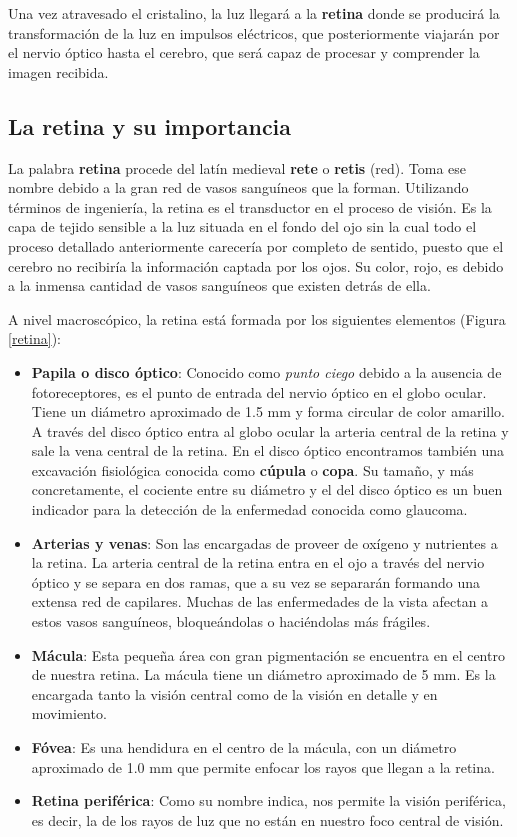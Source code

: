 \documentclass[
  12pt,
  spanish,
  a4paperpaper,
]{report}
\providecommand{\tightlist}{%
  \setlength{\itemsep}{0pt}\setlength{\parskip}{0pt}}
\begin{document}
Una vez atravesado el cristalino, la luz llegará a la \textbf{retina}
donde se producirá la transformación de la luz en impulsos eléctricos,
que posteriormente viajarán por el nervio óptico hasta el cerebro, que
será capaz de procesar y comprender la imagen recibida.

\hypertarget{la-retina-y-su-importancia}{%
\subsection{La retina y su
importancia}\label{la-retina-y-su-importancia}}

La palabra \textbf{retina} procede del latín medieval \textbf{rete} o
\textbf{retis} (red). Toma ese nombre debido a la gran red de vasos
sanguíneos que la forman. Utilizando términos de ingeniería, la retina
es el transductor en el proceso de visión. Es la capa de tejido sensible
a la luz situada en el fondo del ojo sin la cual todo el proceso
detallado anteriormente carecería por completo de sentido, puesto que el
cerebro no recibiría la información captada por los ojos. Su color,
rojo, es debido a la inmensa cantidad de vasos sanguíneos que existen
detrás de ella.

A nivel macroscópico, la retina está formada por los siguientes
elementos (Figura \ref{retina}):

\begin{itemize}
\tightlist
\item
  \textbf{Papila o disco óptico}: Conocido como \emph{punto ciego}
  debido a la ausencia de fotoreceptores, es el punto de entrada del
  nervio óptico en el globo ocular. Tiene un diámetro aproximado de 1.5
  mm y forma circular de color amarillo. A través del disco óptico entra
  al globo ocular la arteria central de la retina y sale la vena central
  de la retina. En el disco óptico encontramos también una excavación
  fisiológica conocida como \textbf{cúpula} o \textbf{copa}. Su tamaño,
  y más concretamente, el cociente entre su diámetro y el del disco
  óptico es un buen indicador para la detección de la enfermedad
  conocida como glaucoma.
\item
  \textbf{Arterias y venas}: Son las encargadas de proveer de oxígeno y
  nutrientes a la retina. La arteria central de la retina entra en el
  ojo a través del nervio óptico y se separa en dos ramas, que a su vez
  se separarán formando una extensa red de capilares. Muchas de las
  enfermedades de la vista afectan a estos vasos sanguíneos,
  bloqueándolas o haciéndolas más frágiles.
\item
  \textbf{Mácula}: Esta pequeña área con gran pigmentación se encuentra
  en el centro de nuestra retina. La mácula tiene un diámetro aproximado
  de 5 mm. Es la encargada tanto la visión central como de la visión en
  detalle y en movimiento.
\item
  \textbf{Fóvea}: Es una hendidura en el centro de la mácula, con un
  diámetro aproximado de 1.0 mm que permite enfocar los rayos que llegan
  a la retina.
\item
  \textbf{Retina periférica}: Como su nombre indica, nos permite la
  visión periférica, es decir, la de los rayos de luz que no están en
  nuestro foco central de visión.
\end{itemize}
\end{document}
